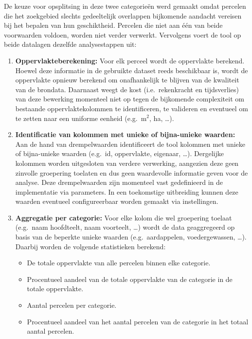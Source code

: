 De keuze voor opsplitsing in deze twee categorieën werd gemaakt omdat percelen die het zoekgebied slechts gedeeltelijk overlappen bijkomende aandacht vereisen bij het bepalen van hun geschiktheid.
Percelen die niet aan één van beide voorwaarden voldoen, worden niet verder verwerkt.
Vervolgens voert de tool op beide datalagen dezelfde analyse\-stappen uit:

\begin{enumerate}
    \item \textbf{Oppervlakteberekening:} Voor elk perceel wordt de oppervlakte berekend.
    Hoewel deze informatie in de gebruikte dataset reeds beschikbaar is, wordt de oppervlakte opnieuw berekend om onafhankelijk te blijven van de kwaliteit van de brondata.
    Daarnaast weegt de kost (i.e.\ rekenkracht en tijdsverlies) van deze bewerking momenteel niet op tegen de bijkomende complexiteit om bestaande oppervlakte\-kolommen te identificeren, te valideren en eventueel om te zetten naar een uniforme eenheid (e.g.\ m$^2$, ha, \ldots).

    \item \textbf{Identificatie van kolommen met unieke of bijna-unieke waarden:} Aan de hand van drempelwaarden identificeert de tool kolommen met unieke of bijna-unieke waarden (e.g.\ id, oppervlakte, eigenaar, \ldots).
    Dergelijke kolommen worden uitgesloten van verdere verwerking, aangezien deze geen zinvolle groepering toelaten en dus geen waardevolle informatie geven voor de analyse.
    Deze drempelwaarden zijn momenteel vast gedefinieerd in de implementatie via parameters. 
    In een toekomstige uitbreiding kunnen deze waarden eventueel configureerbaar worden gemaakt via instellingen.

    \item \textbf{Aggregatie per categorie:} Voor elke kolom die wel groepering toelaat (e.g.\ naam hoofdteelt, naam voorteelt, \ldots) wordt de data geaggregeerd op basis van de beperkte unieke waarden (e.g.\ aardappelen, voedergewassen, \ldots).
    Daarbij worden de volgende statistieken berekend:
    
    \begin{itemize}
        \item De totale oppervlakte van alle percelen binnen elke categorie.
        \item Procentueel aandeel van de totale oppervlakte van de categorie in de totale oppervlakte.
        \item Aantal percelen per categorie.
        \item Procentueel aandeel van het aantal percelen van de categorie in het totaal aantal percelen.
    \end{itemize}
\end{enumerate}

